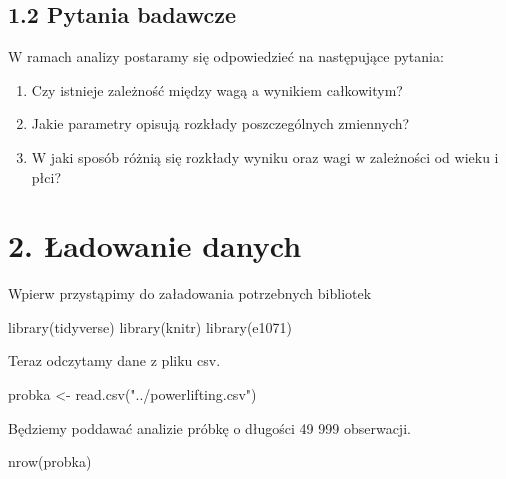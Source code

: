 \documentclass[
  letterpaper,
  DIV=11,
  numbers=noendperiod]{scrartcl}
\newenvironment{Shaded}{\begin{snugshade}}{\end{snugshade}}
\newcommand{\FunctionTok}[1]{\textcolor[rgb]{0.28,0.35,0.67}{#1}}
\newcommand{\NormalTok}[1]{\textcolor[rgb]{0.00,0.23,0.31}{#1}}
\newcommand{\OtherTok}[1]{\textcolor[rgb]{0.00,0.23,0.31}{#1}}
\newcommand{\StringTok}[1]{\textcolor[rgb]{0.13,0.47,0.30}{#1}}
\begin{document}
\hypertarget{pytania-badawcze}{%
\subsection{1.2 Pytania badawcze}\label{pytania-badawcze}}

W ramach analizy postaramy się odpowiedzieć na następujące pytania:

\begin{enumerate}
\def\labelenumi{\arabic{enumi}.}
\item
  Czy istnieje zależność między wagą a wynikiem całkowitym?
\item
  Jakie parametry opisują rozkłady poszczególnych zmiennych?
\item
  W jaki sposób różnią się rozkłady wyniku oraz wagi w zależności od
  wieku i płci?
\end{enumerate}

\hypertarget{ux142adowanie-danych}{%
\section{2. Ładowanie danych}\label{ux142adowanie-danych}}

Wpierw przystąpimy do załadowania potrzebnych bibliotek

\begin{Shaded}
\begin{Highlighting}[]
\FunctionTok{library}\NormalTok{(tidyverse)}
\FunctionTok{library}\NormalTok{(knitr)}
\FunctionTok{library}\NormalTok{(e1071)}
\end{Highlighting}
\end{Shaded}

Teraz odczytamy dane z pliku csv.

\begin{Shaded}
\begin{Highlighting}[]
\NormalTok{probka }\OtherTok{\textless{}{-}} \FunctionTok{read.csv}\NormalTok{(}\StringTok{"../powerlifting.csv"}\NormalTok{)}
\end{Highlighting}
\end{Shaded}

Będziemy poddawać analizie próbkę o długości 49 999 obserwacji.

\begin{Shaded}
\begin{Highlighting}[]
\FunctionTok{nrow}\NormalTok{(probka)}
\end{Highlighting}
\end{Shaded}
\end{document}
